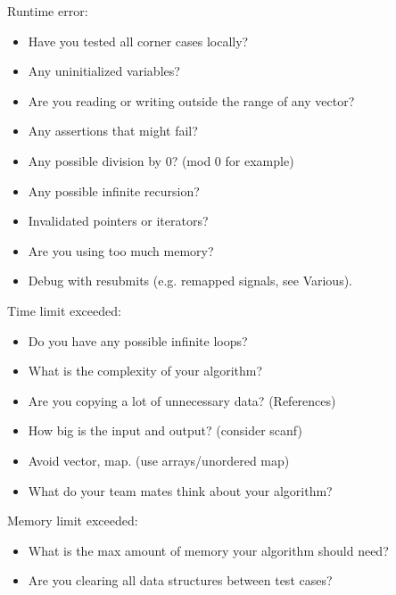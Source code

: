 Runtime error:
\begin{itemize}
\item Have you tested all corner cases locally?
\item Any uninitialized variables?
\item Are you reading or writing outside the range of any vector?
\item Any assertions that might fail?
\item Any possible division by 0? (mod 0 for example)
\item Any possible infinite recursion?
\item Invalidated pointers or iterators?
\item Are you using too much memory?
\item Debug with resubmits (e.g. remapped signals, see Various).
\end{itemize}

Time limit exceeded:
\begin{itemize}
\item Do you have any possible infinite loops?
\item What is the complexity of your algorithm?
\item Are you copying a lot of unnecessary data? (References)
\item How big is the input and output? (consider scanf)
\item Avoid vector, map. (use arrays/unordered map)
\item What do your team mates think about your algorithm?
\end{itemize}

Memory limit exceeded:
\begin{itemize}
\item What is the max amount of memory your algorithm should need?
\item Are you clearing all data structures between test cases?
\end{itemize}
